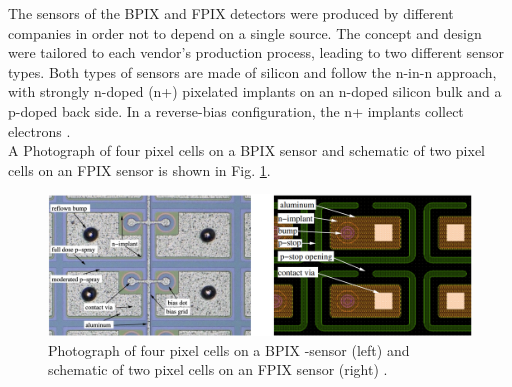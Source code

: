 The sensors of the BPIX and FPIX detectors were produced by different companies in order not to depend on a single source. The concept and design were tailored to each vendor's production process, leading to two different sensor types. Both types of sensors are made of silicon and follow the n-in-n approach, with strongly n-doped (n+) pixelated implants on an n-doped silicon bulk and a p-doped back side. In a reverse-bias configuration, the n+ implants collect electrons \cite{phase1_Pixel_Detector}.\\
A Photograph of four pixel cells on a BPIX sensor and schematic of two pixel cells on an FPIX sensor is shown in Fig. \ref{photo_pixel}.%
\begin{center}
  \begin{figure}[ht]
    \centering
    \includegraphics[scale=.2]{Chapter2/pixel_foto.png}
    \caption[Photograph of four pixels cells on a BPIX sensor and schematic of two pixel cells on an FPIX sensor]{ Photograph of four pixel cells on a BPIX -sensor (left) and schematic of two pixel cells on an FPIX sensor (right) \cite{phase1_Pixel_Detector}.}
    \label{photo_pixel}
  \end{figure}
\end{center}
